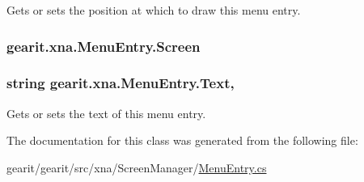 Gets or sets the position at which to draw this menu entry. 

\hypertarget{classgearit_1_1xna_1_1_menu_entry_a83543c01ecdf4bd04bde3f98b1a44977}{
\subsubsection[{Screen}]{ gearit.\+xna.\+Menu\+Entry.\+Screen\hspace{0.3cm}{\ttfamily [get]}}}\label{classgearit_1_1xna_1_1_menu_entry_a83543c01ecdf4bd04bde3f98b1a44977}
\hypertarget{classgearit_1_1xna_1_1_menu_entry_a4c9cc29aa9d4312a5349ed2cf1639655}{
\subsubsection[{Text}]{\setlength{\rightskip}{0pt plus 5cm}string gearit.\+xna.\+Menu\+Entry.\+Text\hspace{0.3cm}{\ttfamily [get]}, {\ttfamily [set]}}}\label{classgearit_1_1xna_1_1_menu_entry_a4c9cc29aa9d4312a5349ed2cf1639655}


Gets or sets the text of this menu entry. 



The documentation for this class was generated from the following file\+:\begin{DoxyCompactItemize}
\item 
gearit/gearit/src/xna/\+Screen\+Manager/\hyperlink{_menu_entry_8cs}{Menu\+Entry.\+cs}\end{DoxyCompactItemize}
